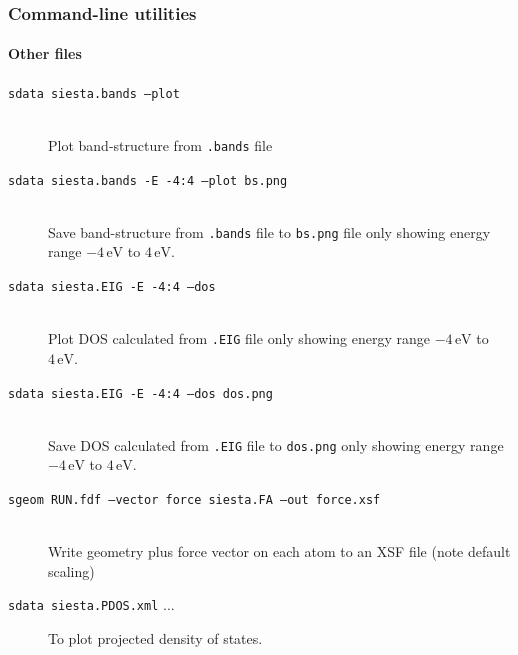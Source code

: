 \begin{frame}[fragile]
  \frametitle{Command-line utilities}
  \framesubtitle{Other files}

  \begin{description}
    \item[\texttt{sdata siesta.bands --plot}]\mbox{}\\

    Plot band-structure from \texttt{.bands} file

    \item[\texttt{sdata siesta.bands -E -4:4 --plot bs.png}]\mbox{}\\

    Save band-structure from \texttt{.bands} file to \texttt{bs.png} file only showing
    energy range $-4\,\mathrm{eV}$ to $4\,\mathrm{eV}$.

    \item[\texttt{sdata siesta.EIG -E -4:4 --dos}]\mbox{}\\

    Plot DOS calculated from \texttt{.EIG} file only showing
    energy range $-4\,\mathrm{eV}$ to $4\,\mathrm{eV}$.

    \item[\texttt{sdata siesta.EIG -E -4:4 --dos dos.png}]\mbox{}\\

    Save DOS calculated from \texttt{.EIG} file to \texttt{dos.png} only showing
    energy range $-4\,\mathrm{eV}$ to $4\,\mathrm{eV}$.

    \item[\texttt{sgeom RUN.fdf --vector force siesta.FA --out force.xsf}]\mbox{}\\

    Write geometry plus force vector on each atom to an XSF file (note default scaling)

  \item[\texttt{sdata siesta.PDOS.xml} ...] To plot projected density of states.

  \end{description}

\end{frame}
